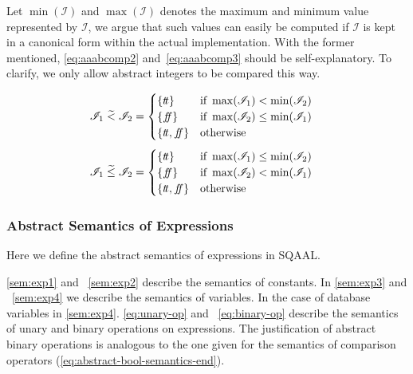 Let $\min(\mathscr{I})$ and $\max(\mathscr{I})$ denotes the maximum and minimum value represented by $\mathscr{I}$, we argue that such values can easily be computed if $\mathscr{I}$ is kept in a canonical form within the actual implementation.
With the former mentioned, \autoref{eq:aaabcomp2} and~\ref{eq:aaabcomp3} should be self-explanatory.
To clarify, we only allow abstract integers to be compared this way.

\begin{align}\label{eq:aaabcomp2}
    \mathscr{I}_1 \;\aab{<}\; \mathscr{I}_2 &= \begin{cases}
        \{\true\} & \text{if } \max(\mathscr{I}_1) < \min(\mathscr{I}_2) \\
        \{\false\} & \text{if } \max(\mathscr{I}_2) \leq \min (\mathscr{I}_1) \\
        \{\true, \false\} & \text{otherwise}
    \end{cases}
\end{align}
\begin{align}\label{eq:aaabcomp3}
    \mathscr{I}_1 \;\aab{\leq}\; \mathscr{I}_2 &= \begin{cases}
        \{\true\} & \text{if } \max(\mathscr{I}_1) \leq \min(\mathscr{I}_2) \\
        \{\false\} & \text{if } \max(\mathscr{I}_2) < \min (\mathscr{I}_1) \\
        \{\true, \false\} & \text{otherwise}
    \end{cases}
\end{align}

\subsubsection{Abstract Semantics of Expressions}

Here we define the abstract semantics of expressions in SQAAL.

\autoref{sem:exp1} and ~\ref{sem:exp2} describe the semantics of constants.
In \autoref{sem:exp3} and ~\ref{sem:exp4} we describe the semantics of variables.
In the case of database variables in \autoref{sem:exp4}.
\autoref{eq:unary-op} and ~\ref{eq:binary-op} describe the semantics of unary and binary operations on expressions.
The justification of abstract binary operations is analogous to the one given for the semantics of comparison operators (\autoref{eq:abstract-bool-semantics-end}).

